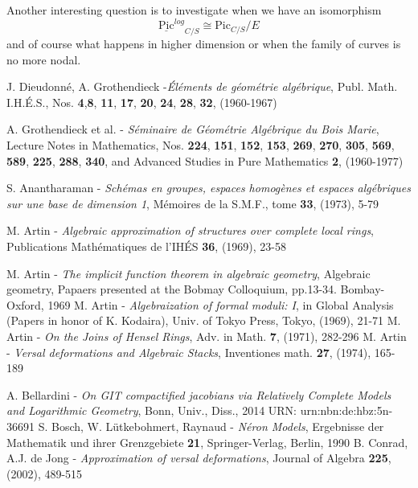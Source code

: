 \documentclass{amsart}
\theoremstyle{definition}
\numberwithin{equation}{section}
\begin{document}
\noindent Another interesting question is to investigate when we have an isomorphism
$$
{\underline{\mbox{Pic}}^{log}}_{C/S}\cong {\mbox{Pic}}_{C/S}/E
$$
\noindent and of course what happens in higher dimension or when the family of curves is no more nodal.
\begin{thebibliography}{99}
 J. Dieudonn\'e, A. Grothendieck -\emph{\'El\'ements de g\'eom\'etrie alg\'ebrique}, Publ. Math. I.H.\'E.S., Nos. \textbf{4},\textbf{8}, \textbf{11}, \textbf{17}, \textbf{20}, \textbf{24}, \textbf{28}, \textbf{32}, (1960-1967)

 A. Grothendieck et al. - \emph{S\'eminaire de G\'eom\'etrie Alg\'ebrique du Bois Marie}, Lecture Notes in Mathematics, Nos. \textbf{224}, \textbf{151}, \textbf{152}, \textbf{153}, \textbf{269}, \textbf{270}, \textbf{305}, \textbf{569}, \textbf{589}, \textbf{225}, \textbf{288}, \textbf{340}, and Advanced Studies in Pure Mathematics \textbf{2}, (1960-1977)

 S. Anantharaman - \emph{Sch\'emas en groupes, espaces homog\`enes et espaces alg\'ebriques sur une base de dimension 1}, M\'emoires de la S.M.F., tome \textbf{33}, (1973), 5-79

 M. Artin - \emph{Algebraic approximation of structures over complete local rings}, Publications Math\'ematiques de l'IH\'ES \textbf{36}, (1969), 23-58

 M. Artin - \emph{The implicit function theorem in algebraic geometry}, Algebraic geometry, Papaers presented at the Bobmay Colloquium, pp.13-34. Bombay-Oxford, 1969
 M. Artin - \emph{Algebraization of formal moduli: I}, in Global Analysis (Papers in honor of K. Kodaira), Univ. of Tokyo Press, Tokyo, (1969), 21-71
 M. Artin - \emph{On the Joins of Hensel Rings}, Adv. in Math. \textbf{7}, (1971), 282-296
 M. Artin - \emph{Versal deformations and Algebraic Stacks}, Inventiones math. \textbf{27}, (1974), 165-189

 A. Bellardini - \emph{On GIT compactified jacobians via Relatively Complete Models and Logarithmic Geometry}, Bonn, Univ., Diss., 2014 URN: urn:nbn:de:hbz:5n-36691
 S. Bosch, W. L\"utkebohmert, Raynaud - \emph{N\'eron Models}, Ergebnisse der Mathematik und ihrer Grenzgebiete \textbf{21}, Springer-Verlag, Berlin, 1990
 B. Conrad, A.J. de Jong - \emph{Approximation of versal deformations}, Journal of Algebra \textbf{225}, (2002), 489-515


\end{thebibliography}
\end{document}
